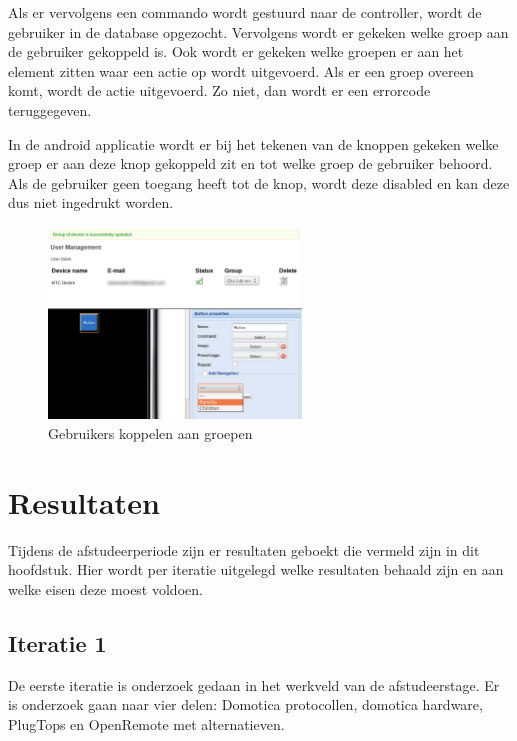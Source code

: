 \documentclass[]{article}
\begin{document}
Als er vervolgens een commando wordt gestuurd naar de controller, wordt de
gebruiker in de database opgezocht. Vervolgens wordt er gekeken welke groep aan
de gebruiker gekoppeld is. Ook wordt er gekeken welke groepen er aan het element
zitten waar een actie op wordt uitgevoerd. Als er een groep overeen komt, wordt
de actie uitgevoerd. Zo niet, dan wordt er een errorcode teruggegeven.

In de android applicatie wordt er bij het tekenen van de knoppen gekeken welke
groep er aan deze knop gekoppeld zit en tot welke groep de gebruiker behoord.
Als de gebruiker geen toegang heeft tot de knop, wordt deze disabled en kan deze
dus niet ingedrukt worden.

\begin{figure}[htpb]
   \begin{center}
     \includegraphics[width=0.6\textwidth]{usergroups.pdf}
   \end{center}
   \caption{Gebruikers koppelen aan groepen}
   \label{usergroups}
\end{figure}

\newpage
\section{Resultaten}

Tijdens de afstudeerperiode zijn er resultaten geboekt die vermeld zijn in dit
hoofdstuk. Hier wordt per iteratie uitgelegd welke resultaten behaald
zijn en aan welke eisen deze moest voldoen.

\subsection{Iteratie 1}
De eerste iteratie is onderzoek gedaan in het werkveld van de afstudeerstage.
Er is onderzoek gaan naar vier delen: Domotica protocollen, domotica hardware,
PlugTops en OpenRemote met alternatieven. 
\end{document}
